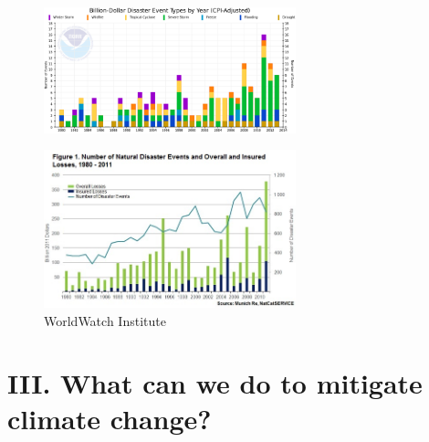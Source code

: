 \begin{frame}
    \vspace{-2mm}
    \begin{figure}
        \begin{center}
            \includegraphics[width=0.65\textwidth]{../images/noaa-billion-dollar-disasters.png}
        \end{center}
    \end{figure}

    \vspace{-4mm}
    \begin{figure}
        \begin{center}
            \includegraphics[width=0.65\textwidth]{../images/world-watch-institute-disaster-costs.jpg}
            \caption{\tiny WorldWatch Institute}
        \end{center}
    \end{figure}
\end{frame}


\section{III. What can we do to mitigate climate change?}

